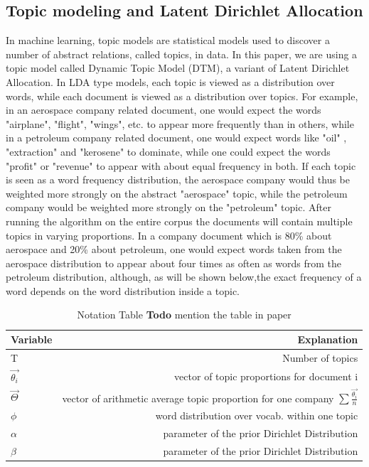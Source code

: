 \documentclass[12pt,journal,letterpaper,oneside,onecolumn]{IEEEtran}
\begin{document}
\subsection{Topic modeling and Latent Dirichlet Allocation}
In machine learning, topic models are statistical models used to discover a number of abstract relations, called topics, in data. In this paper, we are using a topic model called Dynamic Topic Model (DTM), a variant of Latent Dirichlet Allocation.
In LDA type models, each topic is viewed as a distribution over words, while each document is viewed as a distribution over topics.
For example, in an aerospace company related document, one would expect the words "airplane", "flight", "wings", etc. to appear more frequently than in others, while in a petroleum company related document, one would expect words like "oil" , "extraction" and "kerosene" to dominate, while one could expect the words "profit" or "revenue" to appear with about equal frequency in both.
If each topic is seen as a word frequency distribution, the aerospace company would thus be weighted more strongly on the abstract "aerospace" topic, while the petroleum company would be weighted more strongly on the "petroleum" topic.
After running the algorithm on the entire corpus the documents will contain multiple topics in varying proportions. In a company document which is 80\% about aerospace and 20\% about petroleum, one would expect words taken from the aerospace distribution to appear about four times as often as words from the petroleum distribution, although, as will be shown below,the exact frequency of a word depends on the word distribution inside a topic.

\begin{table}
  \begin{center}
    \caption{Notation Table \textbf{Todo} mention the table in paper}
    \label{tabl_notations}
    \begin{tabular}{l|r} %
      \textbf{Variable} & \textbf{Explanation}\\
      \hline
      T & Number of topics\\
      $\vec{\theta_i}$ \ & vector of topic proportions for document i\\
      $\vec{\Theta}$ & vector of arithmetic average topic proportion for one company $\sum{\frac{\vec{\theta_i}}{n}}$ \\
      $\phi$ & word distribution over vocab. within one topic\\
      $\alpha$ & parameter of the prior Dirichlet Distribution \\
      $\beta$ & parameter of the prior Dirichlet Distribution \\

    \end{tabular}
  \end{center}
\end{table}
\end{document}
